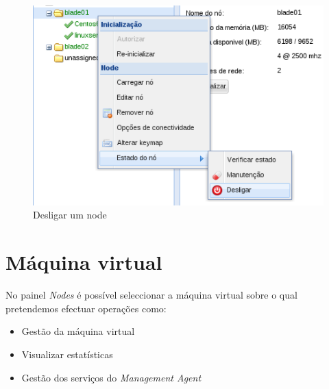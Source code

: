 \begin{figure}[H]
        \begin{center}
        \includegraphics[scale=0.45]{screenshots/shutdownnode.png}
        \caption{Desligar um node}
        \label{fig:storage_lv_ctx}
        \end{center}
\end{figure}

\pagebreak

\section{Máquina virtual}
\label{sec:server}

No painel \emph{Nodes} é possível seleccionar a máquina virtual sobre o qual pretendemos efectuar operações como:

\begin{itemize}
        \item Gestão da máquina virtual
        \item Visualizar estatísticas        
        \item Gestão dos serviços do \emph{Management Agent}
\end{itemize}

